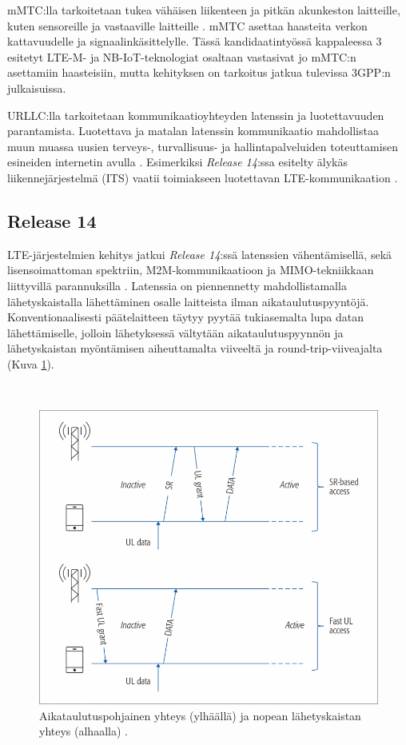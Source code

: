 \documentclass[finnish,12pt,a4paper,pdftex]{article}
\begin{document}
mMTC:lla tarkoitetaan tukea vähäisen liikenteen ja pitkän akunkeston laitteille, kuten sensoreille ja vastaaville laitteille \cite{hoymann2016lte}. mMTC asettaa haasteita verkon kattavuudelle ja signaalinkäsittelylle. Tässä kandidaatintyössä kappaleessa 3 esitetyt LTE-M- ja NB-IoT-teknologiat osaltaan vastasivat jo mMTC:n asettamiin haasteisiin, mutta kehityksen on tarkoitus jatkua tulevissa 3GPP:n julkaisuissa.

URLLC:lla tarkoitetaan kommunikaatioyhteyden latenssin ja luotettavuuden parantamista. Luotettava ja matalan latenssin kommunikaatio mahdollistaa muun muassa uusien terveys-, turvallisuus- ja hallintapalveluiden toteuttamisen esineiden internetin avulla \cite{hoymann2016lte}. Esimerkiksi \textit{Release 14}:ssa esitelty älykäs liikennejärjestelmä (ITS) vaatii toimiakseen luotettavan LTE-kommunikaation \cite{ericssonITS}.

\subsection{Release 14}

LTE-järjestelmien kehitys jatkui \textit{Release 14}:ssä \cite{release14} latenssien vähentämisellä, sekä lisensoimattoman spektriin, M2M-kommunikaatioon ja MIMO-tekniikkaan liittyvillä parannuksilla \cite{ericssonRelease14}. Latenssia on piennennetty mahdollistamalla lähetyskaistalla lähettäminen osalle laitteista ilman aikataulutuspyyntöjä. \cite{hoymann2016lte} Konventionaalisesti päätelaitteen täytyy pyytää tukiasemalta lupa datan lähettämiselle, jolloin lähetyksessä vältytään aikataulutuspyynnön ja lähetyskaistan myöntämisen aiheuttamalta viiveeltä ja round-trip-viiveajalta (Kuva \ref{fig:URLLC}).

~\begin{figure}[h!]
    \centering
    \includegraphics[scale=0.4]{Images/URLLC.png}
    \caption{Aikataulutuspohjainen yhteys (ylhäällä) ja nopean lähetyskaistan yhteys (alhaalla) \cite{hoymann2016lte}.}
    \label{fig:URLLC}
\end{figure}
\end{document}
